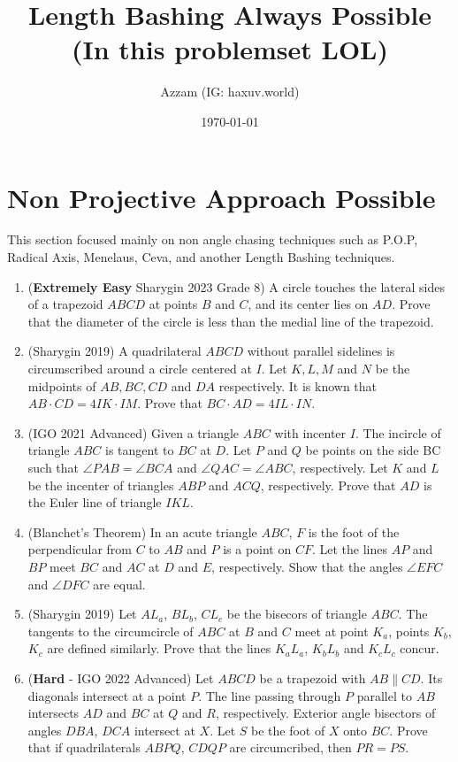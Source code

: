 \documentclass[11pt]{scrartcl}
\title{Length Bashing Always Possible (In this problemset LOL)}
\author{Azzam (IG: haxuv.world)}
\date{\today}
\begin{document}
\maketitle
\section{Non Projective Approach Possible}
This section focused mainly on non angle chasing techniques such as P.O.P, Radical Axis, Menelaus, Ceva, and another Length Bashing techniques.
\begin{enumerate}
    \item (\textbf{Extremely Easy} Sharygin 2023 Grade 8) A circle touches the lateral sides of a trapezoid $ABCD$ at points $B$ and $C$, and its center lies on $AD$. Prove that the diameter of the circle is less than the medial line of the trapezoid.

    \item (Sharygin 2019) A quadrilateral $ABCD$ without parallel sidelines is circumscribed around a circle centered at $I$. Let $K, L, M$ and $N$ be the midpoints of $AB, BC, CD$ and $DA$ respectively. It is known that $AB \cdot CD = 4IK \cdot IM$. Prove that $BC \cdot AD = 4IL \cdot IN$.
    
    \item (IGO 2021 Advanced) Given a triangle $ABC$ with incenter $I$. The incircle of triangle $ABC$ is tangent to $BC$ at $D$. Let $P$ and $Q$ be points on the side BC such that $\angle PAB = \angle BCA$ and $\angle QAC = \angle ABC$, respectively. Let $K$ and $L$ be the incenter of triangles $ABP$ and $ACQ$, respectively. Prove that $AD$ is the Euler line of triangle $IKL$.

    \item (Blanchet’s Theorem) In an acute triangle $ABC$, $F$ is the foot of the perpendicular from $C$ to $AB$ and $P$ is a point on $CF$. Let the lines $AP$ and $BP$ meet $BC$ and $AC$ at $D$ and $E$, respectively. Show that the angles $\angle EFC$ and $\angle DFC$ are equal.

    \item (Sharygin 2019) Let $AL_a$, $BL_b$, $CL_c$ be the bisecors of triangle $ABC$. The tangents to the circumcircle of $ABC$ at $B$ and $C$ meet at point $K_a$, points $K_b$, $K_c$ are defined similarly. Prove that the lines $K_aL_a$, $K_bL_b$ and $K_cL_c$ concur.

    \item (\textbf{Hard} - IGO 2022 Advanced) Let $ABCD$ be a trapezoid with $AB\parallel CD$. Its diagonals intersect at a point $P$. The line passing through $P$ parallel to $AB$ intersects $AD$ and $BC$ at $Q$ and $R$, respectively. Exterior angle bisectors of angles $DBA$, $DCA$ intersect at $X$. Let $S$ be the foot of $X$ onto $BC$. Prove that if quadrilaterals $ABPQ$, $CDQP$ are circumcribed, then $PR=PS$.


\end{enumerate}
\end{document}
